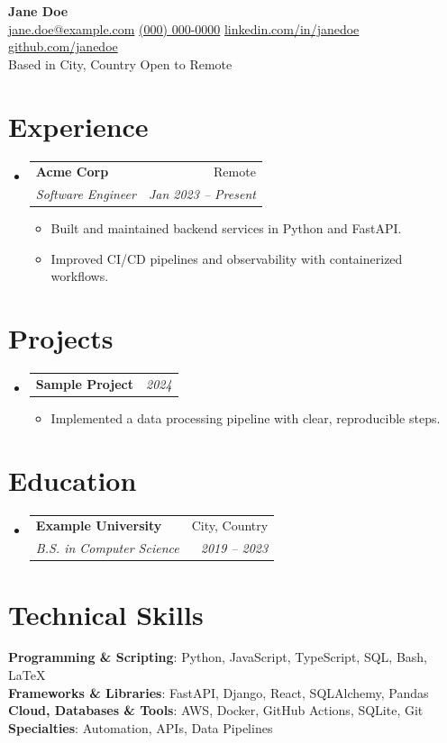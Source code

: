 \documentclass[letterpaper,11pt]{article}
\makeatletter
\newcommand{\resumeItem}[1]{
  \item\small{
    {#1 \vspace{-2pt}}
  }
}
\newcommand{\resumeSubheading}[4]{
  \vspace{-2pt}\item
    \begin{tabular*}{0.97\textwidth}[t]{l@{\extracolsep{\fill}}r}
      \textbf{#1} & #2 \\
      \textit{\small#3} & \textit{\small #4} \\
    \end{tabular*}\vspace{-6pt}
}
\newcommand{\resumeProjectHeading}[2]{%
  \vspace{-2pt}\item
  \begin{tabular*}{\textwidth}{@{}l@{\extracolsep{\fill}}r@{}}%
    \small\textbf{#1} & \textit{#2} \\
  \end{tabular*}\vspace{-6pt}%
}
\newcommand{\resumeSubHeadingListStart}{\begin{itemize}[leftmargin=0.15in, label={}]}
\newcommand{\resumeSubHeadingListEnd}{\end{itemize}}
\makeatother
\begin{document}
\begin{center}
  {\LARGE\textbf{Jane Doe}} \\
  \href{mailto:jane.doe@example.com}{jane.doe@example.com} \textbullet
  \href{tel:+10000000000}{(000) 000-0000} \textbullet
  \href{https://linkedin.com/in/janedoe}{linkedin.com/in/janedoe} \textbullet
  \href{https://github.com/janedoe}{github.com/janedoe} \\
  \small Based in City, Country \quad \textbullet \quad Open to Remote
\end{center}

\section{Experience}
\resumeSubHeadingListStart
  \resumeSubheading{Acme Corp}{Remote}{Software Engineer}{Jan 2023 -- Present}
  \begin{itemize}
    \resumeItem{Built and maintained backend services in Python and FastAPI.}
    \resumeItem{Improved CI/CD pipelines and observability with containerized workflows.}
  \end{itemize}
\resumeSubHeadingListEnd

\section{Projects}
\resumeSubHeadingListStart
  \resumeProjectHeading{\textbf{Sample Project}}{\textit{2024}}
  \begin{itemize}
    \resumeItem{Implemented a data processing pipeline with clear, reproducible steps.}
  \end{itemize}
\resumeSubHeadingListEnd

\section{Education}
\resumeSubHeadingListStart
  \resumeSubheading{Example University}{City, Country}{B.S. in Computer Science}{2019 -- 2023}
\resumeSubHeadingListEnd

\section{Technical Skills}
\begin{itemize}[leftmargin=0.15in, label={}]
  \small{\item{
    \textbf{Programming \& Scripting}{: Python, JavaScript, TypeScript, SQL, Bash, LaTeX} \\
    \textbf{Frameworks \& Libraries}{: FastAPI, Django, React, SQLAlchemy, Pandas} \\
    \textbf{Cloud, Databases \& Tools}{: AWS, Docker, GitHub Actions, SQLite, Git} \\
    \textbf{Specialties}{: Automation, APIs, Data Pipelines}
  }}
\end{itemize}
\end{document}
